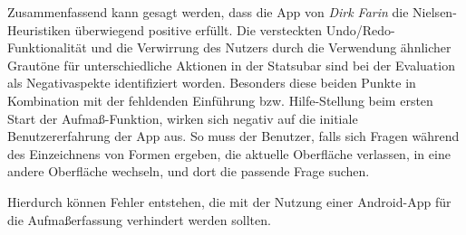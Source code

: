 Zusammenfassend kann gesagt werden, dass die App \im{} von \emph{Dirk Farin} die Nielsen-Heuristiken überwiegend positive erfüllt.
Die versteckten Undo/Redo-Funktionalität und die Verwirrung des Nutzers durch die Verwendung ähnlicher Grautöne für unterschiedliche Aktionen in der Statsubar sind bei der Evaluation als Negativaspekte identifiziert worden.
Besonders diese beiden Punkte in Kombination mit der fehldenden Einführung bzw. Hilfe-Stellung beim ersten Start der Aufmaß-Funktion, wirken sich negativ auf die initiale Benutzererfahrung der App aus.
So muss der Benutzer, falls sich Fragen während des Einzeichnens von Formen ergeben, die aktuelle Oberfläche verlassen, in eine andere Oberfläche wechseln, und dort die passende Frage suchen. 

Hierdurch können Fehler entstehen, die mit der Nutzung einer Android-App für die Aufmaßerfassung verhindert werden sollten.
